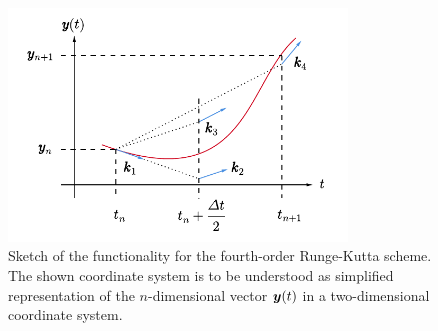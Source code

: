 \documentclass[a4paper,11pt]{report}
\begin{document}
\begin{figure}[h]
\centering
\includegraphics[width=9cm]{figures/rungekutta.pdf}
\caption{Sketch of the functionality for the fourth-order Runge-Kutta scheme. The shown coordinate system is to be understood as simplified representation of the $n$-dimensional vector $\bm{y}(t)$ in a two-dimensional coordinate system.}
\label{fig:rungekutta}
\end{figure}
\end{document}

